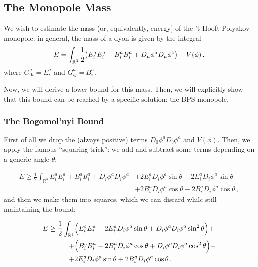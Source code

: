 \documentclass[main.tex]{subfiles}
\begin{document}
\subsection{The Monopole Mass}

We wish to estimate the mass (or, equivalently, energy) of the 't Hooft-Polyakov monopole: in general, the mass of a dyon  is given by the integral
%
\begin{equation} \label{eq:monopole-mass}
  E = \int_{\mathbb{R}^3}
  \frac{1}{2} \qty(E_i^a E_i^a + B_i^a B_i^a + D_\mu \phi^a D_\mu \phi^a) + V(\phi)\,.
\end{equation}
%
where \(G_{0i}^a = E_i^a\) and \(G_{ij}^a = B_i^a\).

Now, we will derive a lower bound for this mass. Then, we will explicitly show that this bound can be reached by a specific solution: the BPS monopole.

\subsubsection{The Bogomol'nyi Bound}

First of all we drop the (always positive) terms \(D_0 \phi^a D_0 \phi^a\) and \(V(\phi)\).
Then, we apply the famous ``squaring trick'': we add and subtract some terms depending on a generic angle \(\theta\):

\begin{equation}
\begin{split}
    E \geq \frac{1}{2}  \int_{\mathbb R^3}   E_i^a E_i^a + B_i^a B_i^a + D_i \phi^a D_i \phi^a &+2 E_i^a D_i \phi^a \sin \theta - 2E_i^a D_i \phi^a \sin \theta \\
  &+2 B_i^a D_i \phi^a \cos \theta - 2 B_i^a D_i \phi^a \cos \theta \,,
\end{split}
\end{equation}
%
and then we make them into squares, which we can discard while still maintaining the bound:
%

\begin{equation}
\begin{split}
    E \geq  \frac{1}{2} \int_{\mathbb R^3}
    &\qty(E_i^a E_i^a - 2 E_i^a D_i\phi^a \sin\theta + D_i\phi^a D_i\phi^a \sin^2\theta) + \\
    + &\qty( B_i^a B_i^a - 2 B_i^a D_i\phi^a \cos\theta + D_i\phi^a D_i\phi^a \cos^2\theta) +  \\
    +&2 E_i^a D_i \phi^a \sin \theta+2 B_i^a D_i \phi^a \cos \theta \,.
\end{split}
\end{equation}
\end{document}
